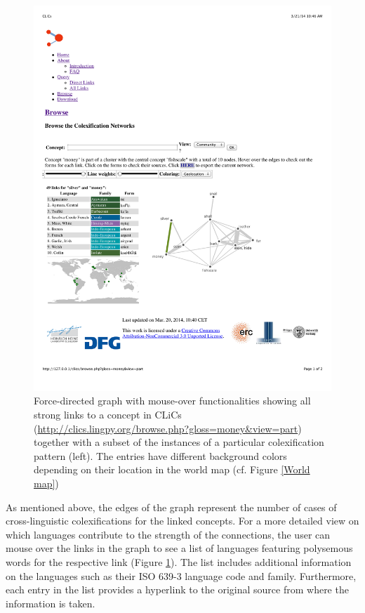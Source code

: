 \begin{figure}[htbp]
\begin{center}
\includegraphics[width=\textwidth]{img/silvermoneyAREAL.pdf}
\caption{Force-directed graph with mouse-over functionalities showing all strong links to a concept in CLiCs (\url{http://clics.lingpy.org/browse.php?gloss=money&view=part}) together with a subset of the instances of a particular colexification pattern (left). The entries have different background colors depending on their location in the world map (cf. Figure \ref{World map})}
\label{MoneySilver}
\end{center}
\end{figure}




As mentioned above, the edges of the graph represent the number of cases of cross-linguistic colexifications for the linked concepts. For a more detailed view on which languages contribute to the strength of the connections, the user can mouse over the links in the graph to see a list of  languages featuring polysemous words for the respective link (Figure \ref{MoneySilver}). The list includes additional information on the languages such as their ISO 639-3 language code and family. Furthermore, each entry in the list provides a hyperlink to the original source from where the information is taken.  

